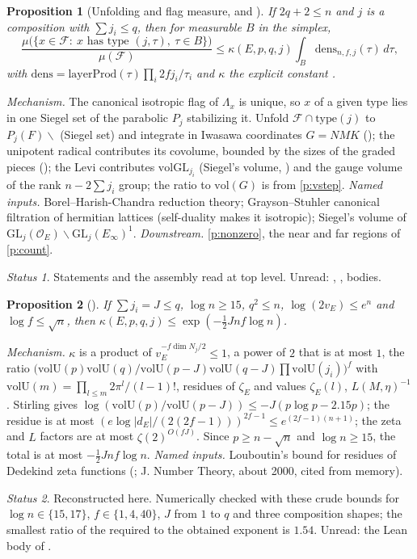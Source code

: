 \documentclass[11pt]{article}
\newcommand{\Ok}{\mathcal O}
\newcommand{\vol}{\mathrm{vol}}
\newtheorem{prop}{Proposition}
\theoremstyle{remark}
\newtheorem*{status}{Status}
\begin{document}
\begin{prop}[Unfolding and flag measure,  and ]\label{p:flag}
If $2q+2\le n$ and $j$ is a composition with $\sum j_i\le q$, then for measurable $B$ in the simplex,
\[
\frac{\mu\bigl(\{x\in\mathcal F:\ x\text{ has type }(j,\tau),\ \tau\in B\}\bigr)}{\mu(\mathcal F)}\le\kappa(E,p,q,j)\int_B\mathrm{dens}_{n,f,j}(\tau)\,d\tau,
\]
with $\mathrm{dens}=\mathrm{layerProd}(\tau)\prod_i2fj_i/\tau_i$ and $\kappa$ the explicit constant .
\end{prop}
\emph{Mechanism.} The canonical isotropic flag of $\Lambda_x$ is unique, so $x$ of a given type lies in one Siegel set of the parabolic $P_j$ stabilizing it. Unfold $\mathcal F\cap\mathrm{type}(j)$ to $P_j(F)\backslash$ (Siegel set) and integrate in Iwasawa coordinates $G=NMK$ (); the unipotent radical contributes its covolume, bounded by the sizes of the graded pieces (); the Levi contributes $\vol\mathrm{GL}_{j_i}$ (Siegel's volume, ) and the gauge volume of the rank $n-2\sum j_i$ group; the ratio to $\vol(G)$ is  from \ref{p:vstep}.
\emph{Named inputs.} Borel--Harish-Chandra reduction theory; Grayson--Stuhler canonical filtration of hermitian lattices (self-duality makes it isotropic); Siegel's volume of $\mathrm{GL}_j(\Ok_E)\backslash\mathrm{GL}_j(E_\infty)^1$.
\emph{Downstream.} \ref{p:nonzero}, the near and far regions of \ref{p:count}.
\begin{status}Statements and the assembly  read at top level. Unread: , ,  bodies.\end{status}

\begin{prop}[]\label{p:const}
If $\sum j_i=J\le q$, $\log n\ge15$, $q^2\le n$, $\log(2v_E)\le e^{n}$ and $\log f\le\sqrt n$, then $\kappa(E,p,q,j)\le\exp(-\tfrac12Jnf\log n)$.
\end{prop}
\emph{Mechanism.} $\kappa$ is a product of $v_E^{-f\dim N_j/2}\le1$, a power of $2$ that is at most $1$, the ratio $\bigl(\vol\mathrm U(p)\vol\mathrm U(q)/\vol\mathrm U(p-J)\vol\mathrm U(q-J)\prod\vol\mathrm U(j_i)\bigr)^f$ with $\vol\mathrm U(m)=\prod_{l\le m}2\pi^l/(l-1)!$, residues of $\zeta_E$ and values $\zeta_E(l)$, $L(M,\eta)^{-1}$. Stirling gives $\log(\vol\mathrm U(p)/\vol\mathrm U(p-J))\le-J(p\log p-2.15p)$; the residue is at most $(e\log|d_E|/(2(2f-1)))^{2f-1}\le e^{(2f-1)(n+1)}$; the zeta and $L$ factors are at most $\zeta(2)^{O(fJ)}$. Since $p\ge n-\sqrt n$ and $\log n\ge15$, the total is at most $-\tfrac12Jnf\log n$.
\emph{Named inputs.} Louboutin's bound for residues of Dedekind zeta functions (; J. Number Theory, about 2000, cited from memory).
\begin{status}Reconstructed here. Numerically checked with these crude bounds for $\log n\in\{15,17\}$, $f\in\{1,4,40\}$, $J$ from $1$ to $q$ and three composition shapes; the smallest ratio of the required to the obtained exponent is $1.54$. Unread: the Lean body of .\end{status}
\end{document}
